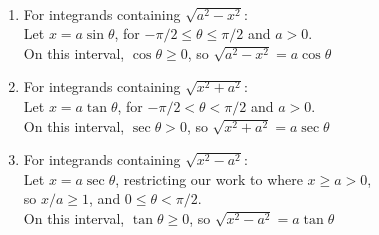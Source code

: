 \begin{keyidea}\label{idea:trigsub}%
\mbox{}\\[-2\baselineskip]\begin{enumerate}%
	\item\label{trigsubsin} For integrands containing $\sqrt{a^2-x^2}$:\smallskip\\
		Let $x=a\sin\theta$, \quad for $-\pi/2\leq \theta\leq \pi/2$ and $a>0$. \smallskip\\
	On this interval, $\cos\theta\geq 0$, so	$\sqrt{a^2-x^2} = a\cos\theta$
		
	\item\label{trigsubtan} For integrands containing $\sqrt{x^2+a^2}$:\smallskip\\
		Let $x=a\tan\theta$, \quad for $-\pi/2 < \theta < \pi/2$ and $a>0$. \smallskip\\
	On this interval, $\sec\theta> 0$, so $\sqrt{x^2+a^2} = a\sec\theta$
		
	\item\label{trigsubsec} For integrands containing $\sqrt{x^2-a^2}$:\smallskip\\
		Let $x=a\sec\theta$, \quad restricting our work to where $x\geq a>0$,\\
		so $x/a\geq 1$, and $0\leq\theta<\pi/2$. \smallskip\\
	On this interval, $\tan\theta\geq 0$, so	$\sqrt{x^2-a^2} = a\tan\theta$
\end{enumerate}
\end{keyidea}

